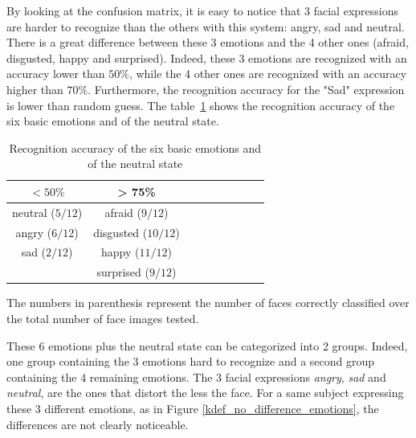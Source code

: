 \noindent By looking at the confusion matrix, it is easy to notice that 3 facial expressions are harder to recognize than the others with this system: angry, sad and neutral. There is a great difference between these 3 emotions and the 4 other ones (afraid, disgusted, happy and surprised). Indeed, these 3 emotions are recognized with an accuracy lower than $ 50\% $, while the 4 other ones are recognized with an accuracy higher than $ 70\% $. Furthermore, the recognition accuracy for the "Sad" expression is lower than random guess. The table~\ref{table_results_accuracy} shows the recognition accuracy of the six basic emotions and of the neutral state.
\newline

\begin{table}[h]
   \caption{\label{table_results_accuracy} Recognition accuracy of the six basic emotions and of the neutral state}
\begin {center}
\begin{tabular}{|c|c|c|c|c|c|c|c|c|}
  \hline
   $ < 50\% $ & > 75\% \\
  \hline
  neutral ($ 5/12 $) & afraid ($ 9/12 $) \\
  angry ($ 6/12 $) & disgusted ($ 10/12 $) \\
  sad ($ 2/12 $) & happy ($ 11/12 $) \\
   & surprised ($ 9/12 $) \\
  \hline
\end{tabular}
\end {center}
\end{table}

\noindent The numbers in parenthesis represent the number of faces correctly classified over the total number of face images tested.
\newline

\noindent These 6 emotions plus the neutral state can be categorized into 2 groups. Indeed, one group containing the 3 emotions hard to recognize and a second group containing the 4 remaining emotions. The 3 facial expressions \textit{angry}, \textit{sad} and \textit{neutral}, are the ones that distort the less the face. For a same subject expressing these 3 different emotions, as in Figure \ref{kdef_no_difference_emotions}, the differences are not clearly noticeable.
\newline

